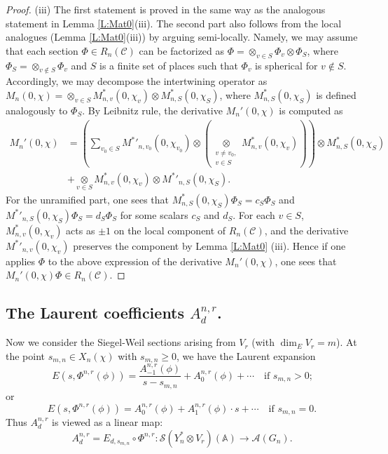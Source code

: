 \documentclass[10pt]{amsart}
\theoremstyle{plain}
\numberwithin{equation}{section}
\begin{document}
\begin{proof}
(iii) The first statement is proved in the same way as the analogous
statement in Lemma \ref{L:Mat0}(iii).  The second part also follows
from the local analogues (Lemma \ref{L:Mat0}(iii)) by arguing
semi-locally. Namely, we may assume that each section $\Phi\in
R_n(\mathcal{C})$ can be factorized as $\Phi=\otimes_{v \in
  S}\Phi_v\otimes\Phi_S$, where $\Phi_S=\otimes_{v\notin S}\Phi_v$ and
$S$ is a finite set of places such that $\Phi_v$ is spherical for
$v\notin S$. Accordingly, we may decompose the intertwining operator as
$M_n(0,\chi)=\otimes_{v\in S}M^*_{n,v}(0,\chi_v)\otimes M^*_{n,S}(0,
\chi_S)$, where $M^*_{n,S}(0,\chi_S)$ is defined analogously to
$\Phi_S$. By Leibnitz rule, the derivative $M_n'(0,\chi)$ is computed as
\begin{align*}
M_n'(0,\chi) &=\left (\sum_{v_0\in S} {M^*}'_{n,v_0}(0,\chi_{v_0}) \otimes
\left( \underset{\substack{v \ne v_0,\\v\in S}}{\otimes} M^*_{n,v}(0,\chi_v)
\right)\right)\otimes M^*_{n,S}(0,\chi_S)\\
&+\underset{v\in S}{\otimes}M^*_{n,v}(0,\chi_v)\otimes {M^*}'_{n,S}(0,
\chi_S).
\end{align*}
For the unramified part, one sees that
$M^*_{n,S}(0,\chi_S)\Phi_S=c_S\Phi_S$ and
${M^*}'_{n,S}(0,\chi_S)\Phi_S=d_S\Phi_S$ for some scalars $c_S$ and
$d_S$. For each $v\in S$, $M^*_{n,v}(0,\chi_v)$ acts as $\pm 1$ on the
local component of $R_n(\mathcal{C})$, and the derivative
${M^*}'_{n,v}(0,\chi_v)$ preserves the component by Lemma \ref{L:Mat0}
(iii). Hence if one applies $\Phi$ to the above expression of the
derivative $M_n'(0,\chi)$, one sees that $M_n'(0,\chi)\Phi\in
R_n(\mathcal{C})$.
\end{proof}

\vskip 5pt
 
 

\subsection{\bf The Laurent coefficients $A^{n,r}_d$.}
Now we consider the Siegel-Weil sections arising from $V_r$ (with
$\dim_E V_r = m$). At the point $s_{m,n} \in X_n(\chi)$ with $s_{m,n} \geq 0$, we have the Laurent
expansion
\[  
E(s, \Phi^{n,r}(\phi)) = 
\frac{A^{n,r}_{-1}(\phi)}{s-s_{m,n}} +  A^{n,r}_0(\phi) + \cdots
\quad \text{if $s_{m,n} > 0$;} 
\] 
or
\[  
E(s, \Phi^{n,r}(\phi)) = 
A^{n,r}_0(\phi) +  A^{n,r}_1(\phi)\cdot s  + \cdots  \quad \text{if
  $s_{m,n} = 0$.} 
\] 
Thus $A_d^{n,r}$ is viewed as a linear map:
\[  A_d^{n,r}  = E_{d, s_{m,n}} \circ \Phi^{n,r}:  \mathcal{S}(Y_n^*
\otimes V_r)({\mathbb{A}}) \longrightarrow \mathcal{A}(G_n). \]
\vskip 5pt
\end{document}
